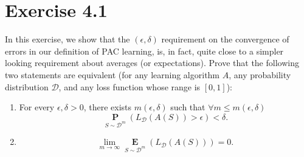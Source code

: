 \documentclass[10pt, a4paper, twoside]{amsart}
\renewcommand{\P}{\operatorname*{\ensuremath{\mathbf{P}}}} %
\newcommand{\Ev}{\operatorname*{\ensuremath{\mathbf{E}}}} %
\begin{document}
\section*{Exercise 4.1}
In this exercise, we show that the $(\epsilon , \delta )$ requirement on the convergence of errors in our definition of PAC learning, is, in fact, quite close to a simpler looking requirement about averages (or expectations). Prove that the following two statements are equivalent (for any learning algorithm $A$, any probability distribution $\mathcal{D}$, and any loss function whose range is $[0,1]$):
\begin{enumerate}
 \item \label{it:convergence_probability} For every $\epsilon , \delta > 0$, there exists $m(\epsilon , \delta)$ such that $\forall m \leq m(\epsilon , \delta)$
\begin{equation*}
\P_{S \sim \mathcal{D}^m}(L_{\mathcal{D}}(A(S))>\epsilon)<\delta.
\end{equation*}
\item \label{it:convergence_expectation} \begin{equation*}
\lim_{m\to \infty}\Ev_{S\sim \mathcal{D}^{m}}(L_{\mathcal{D}}(A(S))) = 0.
\end{equation*}
\end{enumerate}
\end{document}

